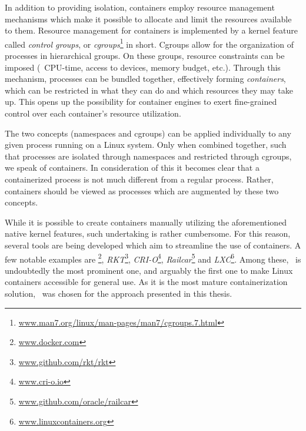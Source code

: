 
In addition to providing isolation, containers employ resource management mechanisms which make it possible to allocate and limit the resources available to them. Resource management for containers is implemented by a kernel feature called \emph{control groups}, or \emph{cgroups}\footnote{\url{www.man7.org/linux/man-pages/man7/cgroups.7.html}} in short. Cgroups allow for the organization of processes in hierarchical groups. On these groups, resource constraints can be imposed (\eg\ CPU-time, access to devices, memory budget, etc.). 
Through this mechanism, processes can be bundled together, effectively forming \emph{containers}, which can be restricted in what they can do and which resources they may take up. This opens up the possibility for container engines to exert fine-grained control over each container's resource utilization.

The two concepts (namespaces and cgroups) can be applied individually to any given process running on a Linux system. Only when combined together, such that processes are isolated through namespaces and restricted through cgroups, we speak of containers. In consideration of this it becomes clear that a containerized process is not much different from a regular process. Rather, containers should be viewed as processes which are augmented by these two concepts.


While it is possible to create containers manually utilizing the aforementioned native kernel features, such undertaking is rather cumbersome. For this reason, several tools are being developed which aim to streamline the use of containers. A few notable examples are \emph{\docker}\footnote{\url{www.docker.com}}, \emph{RKT}\footnote{\url{www.github.com/rkt/rkt}}, \emph{CRI-O}\footnote{\url{www.cri-o.io}}, \emph{Railcar}\footnote{\url{www.github.com/oracle/railcar}} and \emph{LXC}\footnote{\url{www.linuxcontainers.org}}. Among these,  \docker\ is undoubtedly the most prominent one, and arguably the first one to make Linux containers accessible for general use. As it is the most mature containerization solution, \docker\ was chosen for the approach presented in this thesis.


